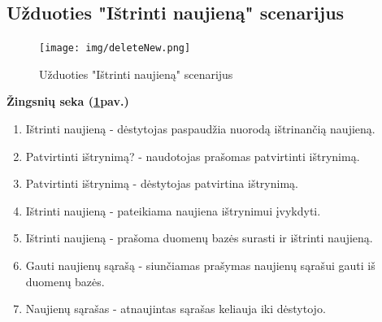 \documentclass{VUMIFPSkursinis}
\begin{document}
\subsection{Užduoties "Ištrinti naujieną" scenarijus}
\begin{figure}[H]
	\centering
	\texttt{[image: img/deleteNew.png]}
	\caption{Užduoties "Ištrinti naujieną" scenarijus}
	\label{fig:delNew}
\end{figure}
\textbf{Žingsnių seka (\ref{fig:delNew}pav.)}\\
\begin{enumerate}
	\item Ištrinti naujieną - dėstytojas paspaudžia nuorodą ištrinančią naujieną.
	\item Patvirtinti ištrynimą? - naudotojas prašomas patvirtinti ištrynimą.
	\item Patvirtinti ištrynimą - dėstytojas patvirtina ištrynimą.
	\item Ištrinti naujieną - pateikiama naujiena ištrynimui įvykdyti.
	\item Ištrinti naujieną - prašoma duomenų bazės surasti ir ištrinti naujieną.
	\item Gauti naujienų sąrašą - siunčiamas prašymas naujienų sąrašui gauti iš duomenų bazės.
	\item Naujienų sąrašas - atnaujintas sąrašas keliauja iki dėstytojo.
\end{enumerate}
\end{document}
